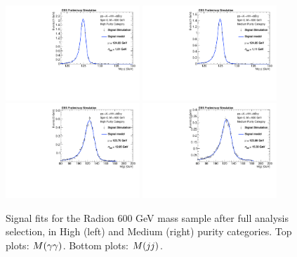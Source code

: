 \begin{figure}[h]
  \centering
  \includegraphics[width=0.45\textwidth]{figures/sec-signals/Rad600_signal_fit_mgg_cat0}\hfil
  \includegraphics[width=0.45\textwidth]{figures/sec-signals/Rad600_signal_fit_mgg_cat1}\hfil
  \includegraphics[width=0.45\textwidth]{figures/sec-signals/Rad600_signal_fit_mjj_cat0}\hfil
  \includegraphics[width=0.45\textwidth]{figures/sec-signals/Rad600_signal_fit_mjj_cat1}\hfil
  \caption{Signal fits for the Radion 600 GeV mass sample after full analysis selection, in High (left) and Medium (right) purity categories. Top plots: $M(\gamma\gamma)$. Bottom plots: $M(jj)$.}
  \label{fig:rad600}
\end{figure}



